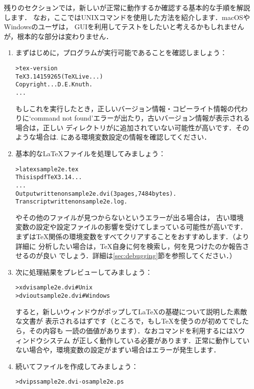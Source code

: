 \documentclass[uplatex,dvipdfmx,tombow]{jsarticle}
\begin{document}
残りのセクションでは，新しい\TL が正常に動作するか確認する基本的な手順を解説します．
なお，ここではUNIXコマンドを使用した方法を紹介します．macOSやWindowsのユーザは，
GUIを利用してテストをしたいと考えるかもしれませんが，根本的な部分は変わりません．

\begin{enumerate}
\item まずはじめに，プログラムが実行可能であることを確認しましょう：
%
\begin{alltt}
> tex -version
TeX 3.14159265 (TeX Live ...)
Copyright ... D.E. Knuth.
...
\end{alltt}
%
もしこれを実行したとき，正しいバージョン情報・コピーライト情報の代わりに`command
not found'エラーが出たり，古いバージョン情報が表示される場合は，正しい%
ディレクトリがに追加されていない可能性が高いです．そのような場合は\p.%
\pageref{sec:env}にある環境変数設定の情報を確認してください．

\item 基本的な\LaTeX ファイルを処理してみましょう：
%
\begin{alltt}
> latex sample2e.tex
This is pdfTeX 3.14...
...
Output written on sample2e.dvi (3 pages, 7484 bytes).
Transcript written on sample2e.log.
\end{alltt}
%
やその他のファイルが見つからないというエラーが出る場合は，
古い環境変数の設定や設定ファイルの影響を受けてしまっている可能性が高いです．
まずは\TeX 関係の環境変数をすべてクリアすることをおすすめします．（より詳細に
分析したい場合は，\TeX 自身に何を検索し，何を見つけたのか報告させるのが良い
でしょう．詳細は\ref{sec:debugging}節を参照してください．）

\item 次に処理結果をプレビューしてみましょう：
%
\begin{alltt}
> xdvi sample2e.dvi    # Unix
> dviout sample2e.dvi  # Windows
\end{alltt}
%
すると，新しいウィンドウがポップして\LaTeX の基礎について説明した素敵な文書が
表示されるはずです（ところで，もし\TeX を使うのが初めてでしたら，その内容も
一読の価値があります）．なおコマンドを利用するにはXウィンドウシステム
が正しく動作している必要があります．正常に動作していない場合や，環境変数の設定がまずい場合はエラーが発生します．

\item 続いて\PS ファイルを作成してみましょう：
%
\begin{alltt}
> dvips sample2e.dvi -o sample2e.ps
\end{alltt}


\end{enumerate}
\end{document}
